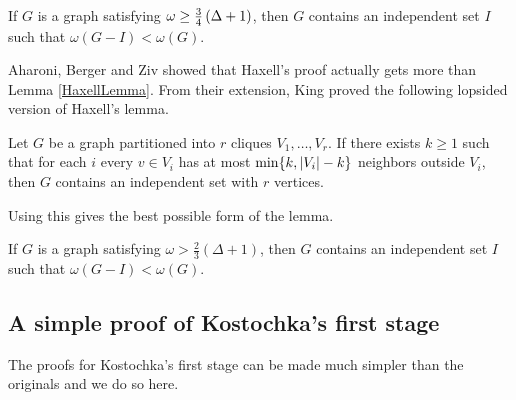 \begin{lem}\label{RabernHitting}
If $G$ is a graph satisfying $\omega \geq \frac{3}{4}\left( \Delta + 1 \right)$, then $G$ contains an independent set $I$ such that $\omega(G - I) < \omega(G)$.
\end{lem}

Aharoni, Berger and Ziv \cite{aharoni2007independent} showed that Haxell's proof actually gets more than Lemma \ref{HaxellLemma}.  
From their extension, King \cite{KingHitting} proved the following lopsided version of Haxell's lemma.

\begin{lem}\label{LopsidedISR}
Let $G$ be a graph partitioned into $r$ cliques $V_1, \ldots, V_r$.  If there exists $k \geq 1$ such that for each $i$ every $v \in V_i$ has at most $\min\{k, \left|V_i\right| - k\}$ neighbors outside $V_i$, then $G$ contains an independent set with $r$ vertices.
\end{lem}

Using this gives the best possible form of the lemma.

\begin{lem}\label{HittingMaxCliques}
If $G$ is a graph satisfying $\omega > \frac23 (\Delta + 1)$, then $G$ contains
an independent set $I$ such that $\omega(G - I) < \omega(G)$.
\end{lem}

\subsection{A simple proof of Kostochka's first stage}
The proofs for Kostochka's first stage can be made much simpler than the originals and we do so here.

